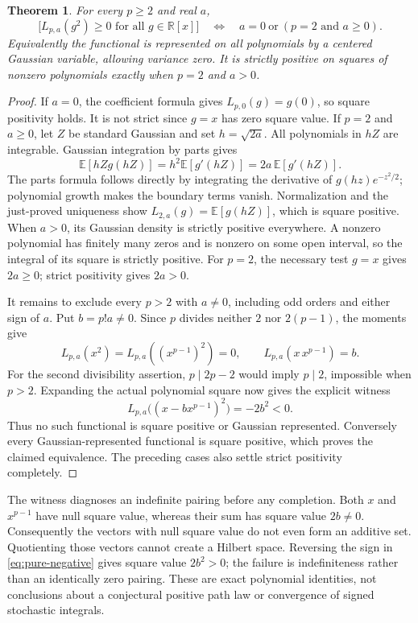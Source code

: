 \documentclass[11pt]{article}
\newtheorem{theorem}{Theorem}[section]
\newcommand{\R}{\mathbb R}
\begin{document}
\begin{theorem}\label{thm:pure-positive}
For every $p\geq2$ and real $a$,
\[
 \bigl[L_{p,a}(g^2)\geq0\text{ for all }g\in\R[x]\bigr]
 \quad\Longleftrightarrow\quad
 a=0\ \text{or}\ (p=2\text{ and }a\geq0).
\]
Equivalently the functional is represented on all polynomials by a
centered Gaussian variable, allowing variance zero. It is strictly
positive on squares of nonzero polynomials exactly when $p=2$ and
$a>0$.
\end{theorem}
\begin{proof}
If $a=0$, the coefficient formula gives $L_{p,0}(g)=g(0)$, so
square positivity holds. It is not strict since $g=x$ has zero square
value. If $p=2$ and $a\geq0$, let $Z$ be standard Gaussian and set
$h=\sqrt{2a}$. All polynomials in $hZ$ are integrable. Gaussian
integration by parts gives
\[
 \mathbb E[hZg(hZ)]=h^2\mathbb E[g'(hZ)]
 =2a\,\mathbb E[g'(hZ)].
\]
The parts formula follows directly by integrating the derivative of
$g(hz)e^{-z^2/2}$; polynomial growth makes the boundary terms vanish.
Normalization and the just-proved uniqueness show
$L_{2,a}(g)=\mathbb E[g(hZ)]$, which is square positive.
When $a>0$, its Gaussian density is strictly positive everywhere.
A nonzero polynomial has finitely many zeros and is nonzero on some
open interval, so the integral of its square is strictly positive.
For $p=2$, the necessary test $g=x$ gives $2a\geq0$; strict
positivity gives $2a>0$.

It remains to exclude every $p>2$ with $a\ne0$, including odd orders
and either sign of $a$. Put $b=p!a\ne0$. Since $p$ divides neither
$2$ nor $2(p-1)$, the moments give
\[
 L_{p,a}(x^2)=L_{p,a}((x^{p-1})^2)=0,
 \qquad L_{p,a}(x\,x^{p-1})=b.
\]
For the second divisibility assertion, $p\mid2p-2$ would imply
$p\mid2$, impossible when $p>2$. Expanding the actual polynomial
square now gives the explicit witness
\begin{equation}\label{eq:pure-negative}
 L_{p,a}\bigl((x-bx^{p-1})^2\bigr)=-2b^2<0.
\end{equation}
Thus no such functional is square positive or Gaussian represented.
Conversely every Gaussian-represented functional is square positive,
which proves the claimed equivalence. The preceding cases also
settle strict positivity completely.
\end{proof}

The witness diagnoses an indefinite pairing before any completion.
Both $x$ and $x^{p-1}$ have null square value, whereas their sum has
square value $2b\ne0$. Consequently the vectors with null square
value do not even form an additive set. Quotienting those vectors
cannot create a Hilbert space. Reversing the sign in
\eqref{eq:pure-negative} gives square value $2b^2>0$; the failure is
indefiniteness rather than an identically zero pairing. These are
exact polynomial identities, not conclusions about a conjectural
positive path law or convergence of signed stochastic integrals.
\end{document}
